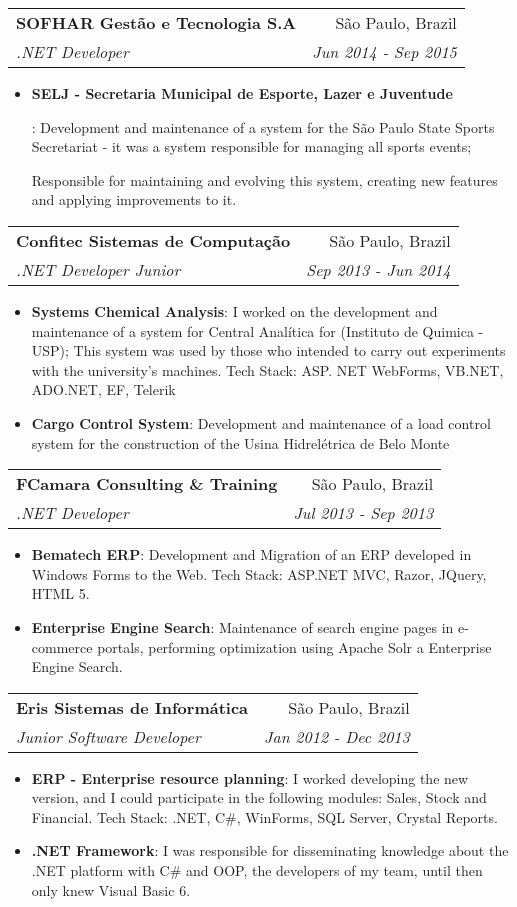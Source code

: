 \documentclass[letterpaper,11pt]{article}
\makeatletter
\newcommand{\resumeItem}[2]{
  \item\small{
    \textbf{#1}{: #2 \vspace{-2pt}}
  }
}
\newcommand{\resumeSubheading}[4]{
  \vspace{-1pt}\item
    \begin{tabular*}{0.97\textwidth}[t]{l@{\extracolsep{\fill}}r}
      \textbf{#1} & #2 \\
      \textit{\small#3} & \textit{\small #4} \\
    \end{tabular*}\vspace{-5pt}
}
\newcommand{\resumeSubSubheading}[2]{
    \begin{tabular*}{0.97\textwidth}{l@{\extracolsep{\fill}}r}
      \textit{\small#1} & \textit{\small #2} \\
    \end{tabular*}\vspace{-5pt}
}
\newcommand{\resumeSubHeadingListEnd}{\end{itemize}}
\newcommand{\resumeItemListStart}{\begin{itemize}}
\newcommand{\resumeItemListEnd}{\end{itemize}\vspace{-5pt}}
\makeatother
\begin{document}
    \resumeSubheading
    {SOFHAR Gestão e Tecnologia S.A}{São Paulo, Brazil}
    {.NET Developer}{Jun 2014 - Sep 2015}
    \resumeItemListStart
      \resumeItem{SELJ - Secretaria Municipal de Esporte, Lazer e Juventude}
        {Development and maintenance of a system for the São Paulo State Sports Secretariat - it was a system responsible for managing all sports events;

        Responsible for maintaining and evolving this system, creating new features and applying improvements to it.}
    \resumeItemListEnd


    \resumeSubheading
      {Confitec Sistemas de Computação}{São Paulo, Brazil}
      {.NET Developer Junior}{Sep 2013 - Jun 2014}
      \resumeItemListStart
        \resumeItem{Systems Chemical Analysis}
          {I worked on the development and maintenance of a system for Central Analítica for (Instituto de Quimica - USP);
           This system was used by those who intended to carry out experiments with the university's machines. Tech Stack: ASP. NET WebForms, VB.NET, ADO.NET, EF, Telerik}
        \resumeItem{Cargo Control System}
          {Development and maintenance of a load control system for the construction of the Usina Hidrelétrica de Belo Monte}
      \resumeItemListEnd

    \resumeSubheading
      {FCamara Consulting \& Training}{São Paulo, Brazil}
      {.NET Developer}{Jul 2013 - Sep 2013}
      \resumeItemListStart
        \resumeItem{Bematech ERP}
          {Development and Migration of an ERP developed in Windows Forms to the Web. Tech Stack: ASP.NET MVC, Razor, JQuery, HTML 5.}
        \resumeItem{Enterprise Engine Search}
          {Maintenance of search engine pages in e-commerce portals, performing optimization using Apache Solr a Enterprise Engine Search.}
      \resumeItemListEnd

    \resumeSubheading
      {Eris Sistemas de Informática}{São Paulo, Brazil}
      {Junior Software Developer}{Jan 2012 - Dec 2013}
      \resumeItemListStart
        \resumeItem{ERP - Enterprise resource planning}
          {I worked developing the new version, and I could participate in the following modules: Sales, Stock and Financial. Tech Stack: .NET, C\#, WinForms, SQL Server, Crystal Reports.}
        \resumeItem{.NET Framework}
          {I was responsible for disseminating knowledge about the .NET platform with C\# and OOP, the developers of my team, until then only knew Visual Basic 6.}
      \resumeItemListEnd
\end{document}
